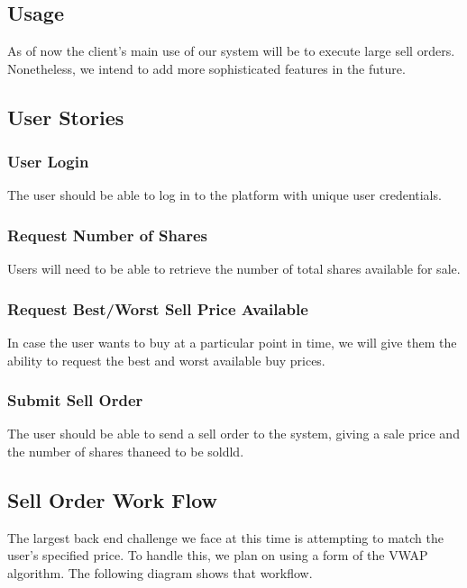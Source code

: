 \documentclass{article}
\begin{document}
\subsection{Usage}
As of now the client's main use of our system will be to execute large sell orders. Nonetheless, we intend to add more sophisticated features in the future.

\subsection{User Stories}

\subsubsection{User Login}

The user should be able to log in to the platform with unique user credentials.

\subsubsection{Request Number of Shares}

Users will need to be able to retrieve the number of total shares available for sale.

\subsubsection{Request Best/Worst Sell Price Available}

In case the user wants to buy at a particular point in time, we will give them the ability to request the best and worst available buy prices. 

\subsubsection{Submit Sell Order}

The user should be able to send a sell order to the system, giving a sale price and the number of shares thaneed to be soldld.

\subsection{Sell Order Work Flow}

The largest back end challenge we face at this time is attempting to match the user's specified price. To handle this, we plan on using a form of the VWAP algorithm. The following diagram shows that workflow.
\end{document}
